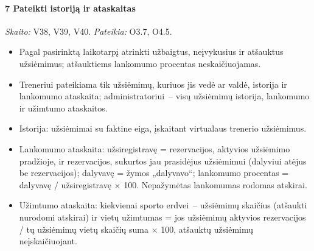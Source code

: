 \paragraph{7 Pateikti istoriją ir ataskaitas}\mbox{}\par
{\small \textit{Skaito:} V38, V39, V40. \textit{Pateikia:} O3.7, O4.5.}
\begin{itemize}
  \item Pagal pasirinktą laikotarpį atrinkti užbaigtus, neįvykusius ir atšauktus užsiėmimus; atšauktiems lankomumo procentas neskaičiuojamas.
  \item Treneriui pateikiama tik užsiėmimų, kuriuos jis vedė ar valdė, istorija ir lankomumo ataskaita; administratoriui~– visų užsiėmimų istorija, lankomumo ir užimtumo ataskaitos.
  \item Istorija: užsiėmimai su faktine eiga, įskaitant virtualaus trenerio užsiėmimus.
  \item Lankomumo ataskaita: užsiregistravę = rezervacijos, aktyvios užsiėmimo pradžioje, ir rezervacijos, sukurtos jau prasidėjus užsiėmimui (dalyviui atėjus be rezervacijos); dalyvavę = žymos „dalyvavo“; lankomumo procentas = dalyvavę / užsiregistravę $\times$ 100. Nepažymėtas lankomumas rodomas atskirai.
  \item Užimtumo ataskaita: kiekvienai sporto erdvei~– užsiėmimų skaičius (atšaukti nurodomi atskirai) ir vietų užimtumas = jos užsiėmimų aktyvios rezervacijos / tų užsiėmimų vietų skaičių suma $\times$ 100, atšauktų užsiėmimų neįskaičiuojant.
\end{itemize}
